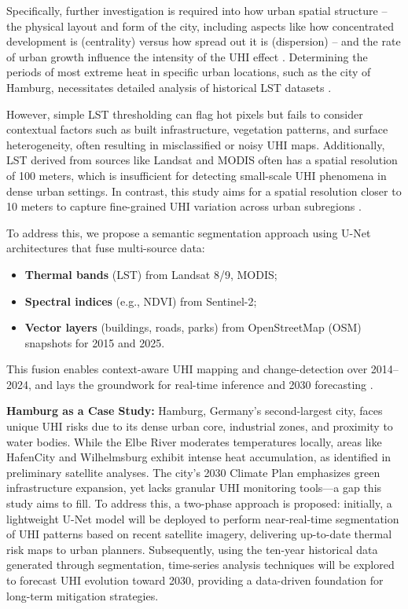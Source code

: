 \documentclass{article}
\begin{document}
Specifically, further investigation is required into how urban spatial structure – the physical layout and form of the city, including aspects like how concentrated development is (centrality) versus how spread out it is (dispersion) – and the rate of urban growth influence the intensity of the UHI effect \parencite{nasa_uhi_day2_2025}. Determining the periods of most extreme heat in specific urban locations, such as the city of Hamburg, necessitates detailed analysis of historical LST datasets \parencite{ncbi_mekelle_uhi_2025}.

However, simple LST thresholding can flag hot pixels but fails to consider contextual factors such as built infrastructure, vegetation patterns, and surface heterogeneity, often resulting in misclassified or noisy UHI maps. Additionally, LST derived from sources like Landsat and MODIS often has a spatial resolution of 100 meters, which is insufficient for detecting small-scale UHI phenomena in dense urban settings. In contrast, this study aims for a spatial resolution closer to 10 meters to capture fine-grained UHI variation across urban subregions \parencite{planetlabs_lst_uhi_2025}.

To address this, we propose a semantic segmentation approach using U-Net architectures that fuse multi-source data:
\begin{itemize}
  \item \textbf{Thermal bands} (LST) from Landsat 8/9, MODIS;
  \item \textbf{Spectral indices} (e.g., NDVI) from Sentinel-2;
  \item \textbf{Vector layers} (buildings, roads, parks) from OpenStreetMap (OSM) snapshots for 2015 and 2025.
\end{itemize}
This fusion enables context-aware UHI mapping and change-detection over 2014–2024, and lays the groundwork for real-time inference and 2030 forecasting \parencite{Ariza2018, Na_2023}.


\vspace{0.5cm}
\textbf{Hamburg as a Case Study:}  
Hamburg, Germany's second-largest city, faces unique UHI risks due to its dense urban core, industrial zones, and proximity to water bodies. While the Elbe River moderates temperatures locally, areas like HafenCity and Wilhelmsburg exhibit intense heat accumulation, as identified in preliminary satellite analyses. The city's 2030 Climate Plan emphasizes green infrastructure expansion, yet lacks granular UHI monitoring tools—a gap this study aims to fill. %
To address this, a two-phase approach is proposed: initially, a lightweight U-Net model will be deployed to perform near-real-time segmentation of UHI patterns based on recent satellite imagery, delivering up-to-date thermal risk maps to urban planners. Subsequently, using the ten-year historical data generated through segmentation, time-series analysis techniques will be explored to forecast UHI evolution toward 2030, providing a data-driven foundation for long-term mitigation strategies.
\end{document}
